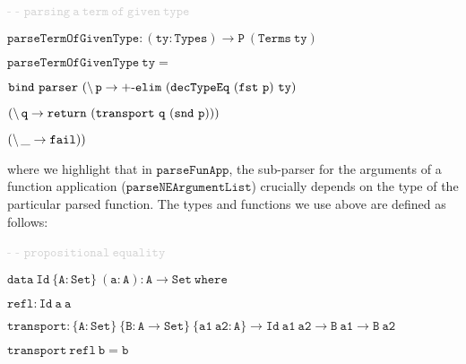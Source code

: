 \hspace{0.5cm}
{\small{\textcolor{lightgray}{- - $\mathtt{parsing ~a ~term ~of ~given ~type}$}}}

\hspace{0.5cm}
{\small{$\mathtt{parseTermOfGivenType : (ty : Types) \to P ~(Terms ~ty)}$}}

\hspace{0.5cm}
{\small{$\mathtt{parseTermOfGivenType ~ty =}$}}

\vspace{-0.1cm}

\hspace{0.75cm}
{\small{$\mathtt{bind ~parser~ (\char`\\ \, p \to +\text{-}elim ~(decTypeEq ~(fst ~p) ~ty)}$}}

\vspace{-0.1cm}

\hspace{5.45cm}
{\small{$\mathtt{(\char`\\ \, q \to return ~(transport ~q ~(snd ~p)))}$}}

\vspace{-0.1cm}

\hspace{5.45cm}
{\small{$\mathtt{(\char`\\ \, \_ \to fail))}$}}

\vspace{0.5cm}

\noindent
where we highlight that in $\mathtt{parseFunApp}$, the sub-parser for the arguments of a function application ($\mathtt{parseNEArgumentList}$) crucially depends on the type of the particular parsed function. The types and functions we use above are defined as follows:

\vspace{0.5cm}

{\small{\textcolor{lightgray}{- - $\mathtt{propositional ~equality}$}}}

{\small{$\mathtt{data ~Id ~\{A : Set\} ~(a : A) : A \to Set ~where}$}}

\hspace{0.25cm}
{\small{$\mathtt{refl : Id ~a ~a}$}}

\vspace{0.25cm}

{\small{$\mathtt{transport : \{A : Set\} ~\{B : A \to Set\} ~\{a1 ~a2 : A\} \to Id ~a1 ~a2 \to B ~a1 \to B ~a2}$}}

{\small{$\mathtt{transport ~refl ~b = b}$}}

